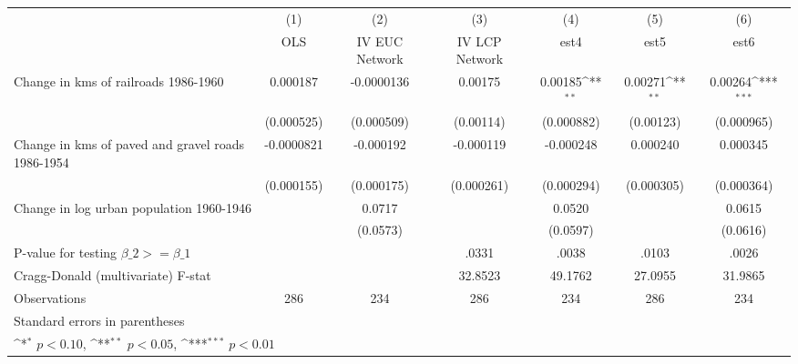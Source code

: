 {
\def\sym#1{\ifmmode^{#1}\else\(^{#1}\)\fi}
\begin{tabular}{l*{6}{c}}
\hline\hline
                &\multicolumn{1}{c}{(1)}&\multicolumn{1}{c}{(2)}&\multicolumn{1}{c}{(3)}&\multicolumn{1}{c}{(4)}&\multicolumn{1}{c}{(5)}&\multicolumn{1}{c}{(6)}\\
                &\multicolumn{1}{c}{OLS}&\multicolumn{1}{c}{IV EUC Network}&\multicolumn{1}{c}{IV LCP Network}&\multicolumn{1}{c}{est4}&\multicolumn{1}{c}{est5}&\multicolumn{1}{c}{est6}\\
\hline
Change in kms of railroads 1986-1960& 0.000187         &-0.0000136         &  0.00175         &  0.00185\sym{**} &  0.00271\sym{**} &  0.00264\sym{***}\\
                &(0.000525)         &(0.000509)         &(0.00114)         &(0.000882)         &(0.00123)         &(0.000965)         \\
[1em]
Change in kms of paved and gravel roads 1986-1954&-0.0000821         &-0.000192         &-0.000119         &-0.000248         & 0.000240         & 0.000345         \\
                &(0.000155)         &(0.000175)         &(0.000261)         &(0.000294)         &(0.000305)         &(0.000364)         \\
[1em]
Change in log urban population 1960-1946&                  &   0.0717         &                  &   0.0520         &                  &   0.0615         \\
                &                  & (0.0573)         &                  & (0.0597)         &                  & (0.0616)         \\
\hline
P-value for testing $\beta\_{2} >= \beta\_{1}$&                  &                  &    .0331         &    .0038         &    .0103         &    .0026         \\
Cragg-Donald (multivariate) F-stat&                  &                  &  32.8523         &  49.1762         &  27.0955         &  31.9865         \\
Observations    &      286         &      234         &      286         &      234         &      286         &      234         \\
\hline\hline
\multicolumn{7}{l}{\footnotesize Standard errors in parentheses}\\
\multicolumn{7}{l}{\footnotesize \sym{*} \(p<0.10\), \sym{**} \(p<0.05\), \sym{***} \(p<0.01\)}\\
\end{tabular}
}

